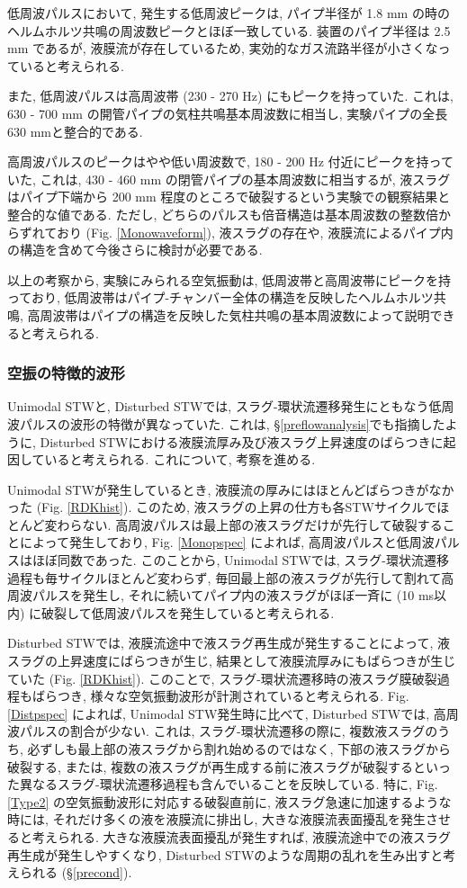 \documentclass[12pt]{article}
\begin{document}
低周波パルスにおいて, 発生する低周波ピークは, パイプ半径が 1.8 mm の時のヘルムホルツ共鳴の周波数ピークとほぼ一致している. 装置のパイプ半径は 2.5 mm であるが, 液膜流が存在しているため, 実効的なガス流路半径が小さくなっていると考えられる. 

また, 低周波パルスは高周波帯 (230 - 270 Hz) にもピークを持っていた. これは, 630 - 700 mm の開管パイプの気柱共鳴基本周波数に相当し, 実験パイプの全長 630 mmと整合的である. 

高周波パルスのピークはやや低い周波数で, 180 - 200 Hz 付近にピークを持っていた, これは, 430 - 460 mm の閉管パイプの基本周波数に相当するが, 液スラグはパイプ下端から 200 mm 程度のところで破裂するという実験での観察結果と整合的な値である. ただし, どちらのパルスも倍音構造は基本周波数の整数倍からずれており (Fig. \ref{Monowaveform}), 液スラグの存在や, 液膜流によるパイプ内の構造を含めて今後さらに検討が必要である.

以上の考察から, 実験にみられる空気振動は, 低周波帯と高周波帯にピークを持っており, 低周波帯はパイプ-チャンバー全体の構造を反映したヘルムホルツ共鳴, 高周波帯はパイプの構造を反映した気柱共鳴の基本周波数によって説明できると考えられる.



\subsubsection{空振の特徴的波形}
Unimodal STWと, Disturbed STWでは, スラグ-環状流遷移発生にともなう低周波パルスの波形の特徴が異なっていた. これは, \S \ref{preflowanalysis}でも指摘したように, Disturbed STWにおける液膜流厚み及び液スラグ上昇速度のばらつきに起因していると考えられる. これについて, 考察を進める.

Unimodal STWが発生しているとき, 液膜流の厚みにはほとんどばらつきがなかった (Fig. \ref{RDKhist}). このため, 液スラグの上昇の仕方も各STWサイクルでほとんど変わらない. 高周波パルスは最上部の液スラグだけが先行して破裂することによって発生しており, Fig. \ref{Monopspec} によれば, 高周波パルスと低周波パルスはほぼ同数であった. このことから, Unimodal STWでは, スラグ-環状流遷移過程も毎サイクルほとんど変わらず, 毎回最上部の液スラグが先行して割れて高周波パルスを発生し, それに続いてパイプ内の液スラグがほぼ一斉に (10 ms以内) に破裂して低周波パルスを発生していると考えられる.

Disturbed STWでは, 液膜流途中で液スラグ再生成が発生することによって, 液スラグの上昇速度にばらつきが生じ, 結果として液膜流厚みにもばらつきが生じていた (Fig. \ref{RDKhist}). このことで, スラグ-環状流遷移時の液スラグ膜破裂過程もばらつき, 様々な空気振動波形が計測されていると考えられる. Fig. \ref{Distpspec} によれば, Unimodal STW発生時に比べて, Disturbed STWでは, 高周波パルスの割合が少ない. これは, スラグ-環状流遷移の際に, 複数液スラグのうち, 必ずしも最上部の液スラグから割れ始めるのではなく, 下部の液スラグから破裂する, または, 複数の液スラグが再生成する前に液スラグが破裂するといった異なるスラグ-環状流遷移過程も含んでいることを反映している.
特に, Fig. \ref{Type2} の空気振動波形に対応する破裂直前に, 液スラグ急速に加速するような時には, それだけ多くの液を液膜流に排出し, 大きな液膜流表面擾乱を発生させると考えられる. 大きな液膜流表面擾乱が発生すれば, 液膜流途中での液スラグ再生成が発生しやすくなり, Disturbed STWのような周期の乱れを生み出すと考えられる (\S \ref{precond}). 
\end{document}
